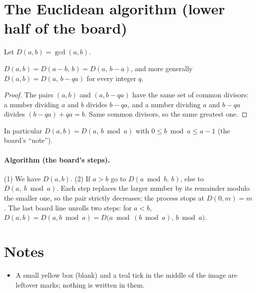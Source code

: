 \documentclass[11pt]{article}
\begin{document}
\section{The Euclidean algorithm (lower half of the board)}

Let $D(a,b)=\gcd(a,b)$.

\begin{claim}[Observation]
$D(a,b)=D(a-b,\,b)=D(a,\,b-a)$, and more generally $D(a,b)=D(a,\,b-qa)$ for every integer $q$.
\end{claim}
\begin{proof}
The pairs $(a,b)$ and $(a,b-qa)$ have the same set of common divisors: a number dividing $a$ and $b$ divides $b-qa$, and a number dividing $a$ and $b-qa$ divides $(b-qa)+qa=b$. Same common divisors, so the same greatest one.
\end{proof}

In particular $D(a,b)=D(a,\,b\bmod a)$ with $0\le b\bmod a\le a-1$ (the board's ``note'').

\paragraph{Algorithm (the board's steps).} (1) We have $D(a,b)$. (2) If $a>b$ go to $D(a\bmod b,\ b)$, else to $D(a,\ b\bmod a)$. Each step replaces the larger number by its remainder modulo the smaller one, so the pair strictly decreases; the process stops at $D(0,m)=m$. The last board line unrolls two steps: for $a<b$, $D(a,b)=D(a,b\bmod a)=D\bigl(a\bmod(b\bmod a),\,b\bmod a\bigr)$.

\section*{Notes}
\begin{itemize}[nosep]
  \item A small yellow box (blank) and a teal tick in the middle of the image are leftover marks; nothing is written in them.
\end{itemize}
\end{document}
